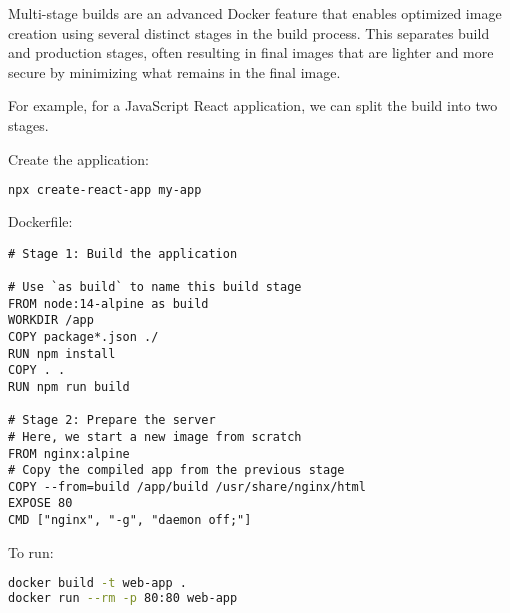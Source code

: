\documentclass[french]{article}
\begin{document}
Multi-stage builds are an advanced Docker feature that enables optimized image creation using several distinct stages in the build process.
This separates build and production stages, often resulting in final images that are lighter and more secure by minimizing what remains in the final image.

For example, for a JavaScript React application, we can split the build into two stages.

Create the application:

\begin{lstlisting}[language=bash]
npx create-react-app my-app
\end{lstlisting}

Dockerfile:

\begin{lstlisting}
# Stage 1: Build the application

# Use `as build` to name this build stage
FROM node:14-alpine as build
WORKDIR /app
COPY package*.json ./
RUN npm install
COPY . .
RUN npm run build

# Stage 2: Prepare the server
# Here, we start a new image from scratch
FROM nginx:alpine
# Copy the compiled app from the previous stage
COPY --from=build /app/build /usr/share/nginx/html
EXPOSE 80
CMD ["nginx", "-g", "daemon off;"]
\end{lstlisting}

To run:

\begin{lstlisting}[language=bash]
docker build -t web-app .
docker run --rm -p 80:80 web-app
\end{lstlisting}
\end{document}
